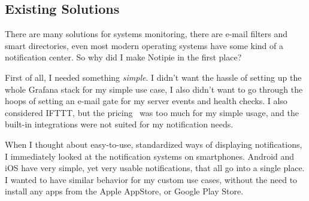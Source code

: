 \subsection{Existing Solutions}\label{sec:existing-solutions}

There are many solutions
for systems monitoring,
there are e-mail filters
and smart directories,
even most modern operating systems have some kind of a notification center.
So why did I make Notipie in the first place?

First of all,
I needed something \emph{simple}.
I didn't want the hassle of setting up
the whole Grafana stack for my simple use case,
I also didn't want to go through the hoops
of setting an e-mail gate
for my server events and health checks.
I also considered IFTTT,
but the pricing~\cite{ifttt_plans_2022}
was too much for my simple usage,
and the built-in integrations
were not suited for my notification needs.

When I thought about easy-to-use,
standardized ways of displaying notifications,
I immediately looked at
the notification systems on smartphones.
Android and iOS have very simple,
yet very usable notifications,
that all go into a single place.
I wanted to have similar behavior
for my custom use cases,
without the need to install any apps
from the Apple AppStore,
or Google Play Store.
